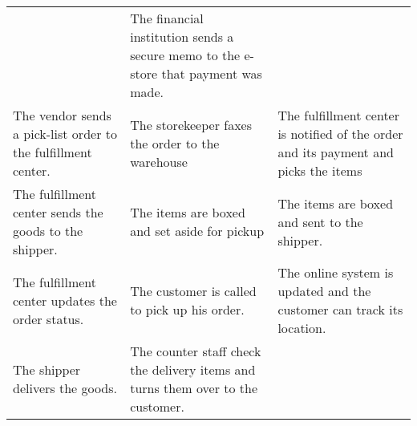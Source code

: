 \documentclass[]{book}
\begin{document}
\begin{longtable}[]{@{}lll@{}}
\begin{minipage}[t]{0.38\columnwidth}
\end{minipage} & \begin{minipage}[t]{0.38\columnwidth}\raggedright
The financial institution sends a secure memo to the e-store that payment was made.\strut
\end{minipage}\tabularnewline
\begin{minipage}[t]{0.15\columnwidth}\raggedright
The vendor sends a pick-list order to the fulfillment center.\strut
\end{minipage} & \begin{minipage}[t]{0.38\columnwidth}\raggedright
The storekeeper faxes the order to the warehouse\strut
\end{minipage} & \begin{minipage}[t]{0.38\columnwidth}\raggedright
The fulfillment center is notified of the order and its payment and picks the items\strut
\end{minipage}\tabularnewline
\begin{minipage}[t]{0.15\columnwidth}\raggedright
The fulfillment center sends the goods to the shipper.\strut
\end{minipage} & \begin{minipage}[t]{0.38\columnwidth}\raggedright
The items are boxed and set aside for pickup\strut
\end{minipage} & \begin{minipage}[t]{0.38\columnwidth}\raggedright
The items are boxed and sent to the shipper.\strut
\end{minipage}\tabularnewline
\begin{minipage}[t]{0.15\columnwidth}\raggedright
The fulfillment center updates the order status.\strut
\end{minipage} & \begin{minipage}[t]{0.38\columnwidth}\raggedright
The customer is called to pick up his order.\strut
\end{minipage} & \begin{minipage}[t]{0.38\columnwidth}\raggedright
The online system is updated and the customer can track its location.\strut
\end{minipage}\tabularnewline
\begin{minipage}[t]{0.15\columnwidth}\raggedright
The shipper delivers the goods.\strut
\end{minipage} & \begin{minipage}[t]{0.38\columnwidth}\raggedright
The counter staff check the delivery items and turns them over to the customer.\strut
\end{minipage} & \begin{minipage}[t]{0.38\columnwidth}\raggedright

\end{minipage}
\end{longtable}
\end{document}
